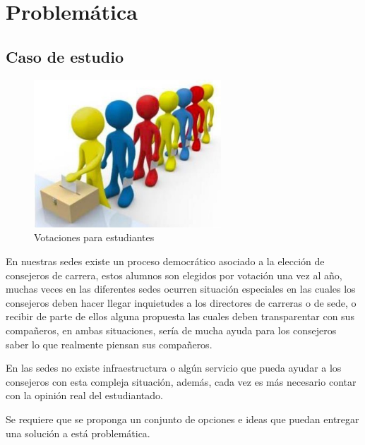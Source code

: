 \section{Problemática}

\subsection{Caso de estudio}
\begin{figure}[h!]
\centering
\includegraphics[width=7cm]{Figuras/caso.jpg}
\caption{Votaciones para estudiantes}
\end{figure}

En nuestras sedes existe un proceso democrático asociado a la elección de consejeros de carrera,
estos alumnos son elegidos por votación una vez al año, muchas veces en las diferentes sedes
ocurren situación especiales en las cuales los consejeros deben hacer llegar inquietudes a los
directores de carreras o de sede, o recibir de parte de ellos alguna propuesta las cuales deben
transparentar con sus compañeros, en ambas situaciones, sería de mucha ayuda para los
consejeros saber lo que realmente piensan sus compañeros.

En las sedes no existe infraestructura o algún servicio que pueda ayudar a los consejeros con esta
compleja situación, además, cada vez es más necesario contar con la opinión real del estudiantado.

Se requiere que se proponga un conjunto de opciones e ideas que puedan entregar una solución a
está problemática. 

